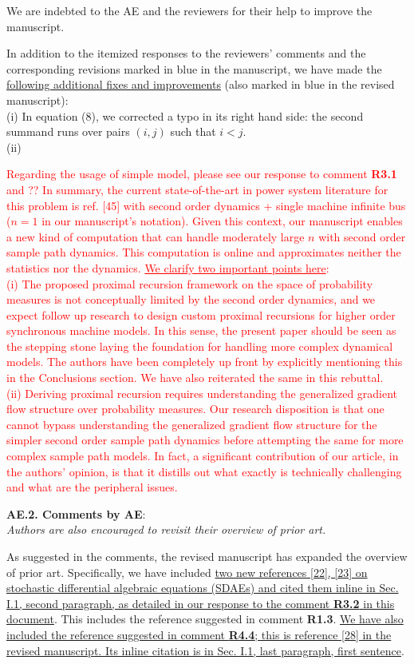 \documentclass[12pt,onecolumn]{IEEEtran}
\newcommand{\blue}{\color{blue}}
\newcommand{\red}{\textcolor{red}}
\newcommand{\nib}{\noindent  {\bf Response:} }
\begin{document}
{\nib {\blue We are indebted to the AE and the reviewers for their help to improve the manuscript.

In addition to the itemized responses to the reviewers' comments and the corresponding revisions marked in blue in the manuscript, we have made the \ul{following additional fixes and improvements} (also marked in blue in the revised manuscript):\\
(i) In equation (8), we corrected a typo in its right hand side: the second summand runs over pairs $(i,j)$ such that $i<j$.\\
(ii) 

{\red{Regarding the usage of simple model, please see our response to comment \textbf{R3.1} and ?? In summary, the current state-of-the-art in power system literature for this problem is ref. [45] with second order dynamics + single machine infinite bus ($n=1$ in our manuscript's notation). Given this context, our manuscript enables a new kind of computation that can handle moderately large $n$ with second order sample path dynamics. This computation is online and approximates neither the statistics nor the dynamics.  \ul{We clarify two important points here}:\\(i) The proposed proximal recursion framework on the space of probability measures is not conceptually limited by the second order dynamics, and we expect follow up research to design custom proximal recursions for higher order synchronous machine models. In this sense, the present paper should be seen as the stepping stone laying the foundation for handling more complex dynamical models. The authors have been completely up front by explicitly mentioning this in the Conclusions section. We have also reiterated the same in this rebuttal.\\(ii) Deriving proximal recursion requires understanding the generalized gradient flow structure over probability measures. Our research disposition is that one cannot bypass understanding the generalized gradient flow structure for the simpler second order sample path dynamics before attempting the same for more complex sample path models. In fact, a significant contribution of our article, in the authors' opinion, is that it distills out what exactly is technically challenging and what are the peripheral issues.}} 
}}


\noindent
{\bf AE.2. Comments by AE}:\\
{\em Authors are also encouraged to revisit their overview of prior art.}

{\nib {\blue As suggested in the comments, the revised manuscript has expanded the overview of prior art. Specifically, we have included \ul{two new references [22], [23] on stochastic differential algebraic equations (SDAEs) and cited them inline in Sec. I.1, second paragraph, as detailed in our response to the comment \textbf{R3.2} in this document}. This includes the reference suggested in comment \textbf{R1.3}. \ul{We have also included the reference suggested in comment \textbf{R4.4}; this is reference [28] in the revised manuscript. Its inline citation is in Sec. I.1, last paragraph, first sentence}.}}
\end{document}
